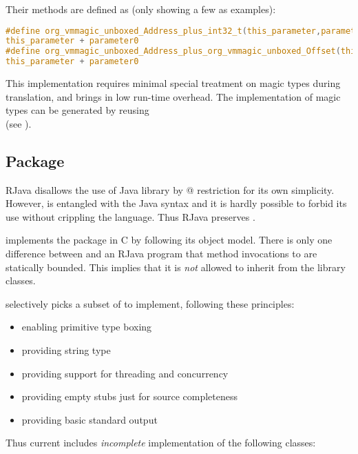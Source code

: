\documentclass[12pt]{article}
\begin{document}
Their methods are defined as (only showing a few as examples):
\begin{lstlisting}[language=c]
#define org_vmmagic_unboxed_Address_plus_int32_t(this_parameter,parameter0) \
this_parameter + parameter0
#define org_vmmagic_unboxed_Address_plus_org_vmmagic_unboxed_Offset(this_parameter,parameter0) \
this_parameter + parameter0
\end{lstlisting}

This implementation requires minimal special treatment
on magic types during translation, and brings in
low run-time overhead. 
The implementation of magic types can be generated by reusing \rjc \\
(see ). 

\subsection{\javacode{java.lang.*} Package}

RJava disallows the use of Java library by 
@ restriction for
its own simplicity. However, 
 is entangled with 
the Java syntax and it is hardly possible to
forbid its use without crippling the language. 
Thus RJava preserves . 

\rjc implements the package in C by following
its object model. There is only one difference
between \rjc {} and an RJava
program that method invocations to 
\javacode{java.lang.*} are statically bounded. 
This implies that it is \emph{not} allowed to
inherit from the library classes. 

\rjc selectively picks a subset of 
to implement, following these principles:
\begin{itemize}
\item enabling primitive type boxing
\item providing string type
\item providing support for threading and concurrency
\item providing empty stubs just for source completeness
\item providing basic standard output
\end{itemize}

Thus current \rjc includes
\emph{incomplete} implementation of the following
classes:
\end{document}

